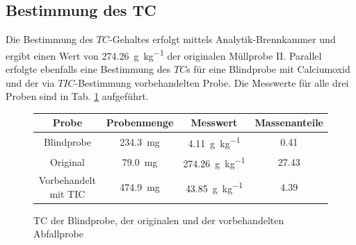 \subsection{Bestimmung des TC}
\label{sec:tc}
Die Bestimmung des $TC$-Gehaltes erfolgt mittels Analytik-Brennkammer und ergibt einen Wert von \SI{274,26}{\gram \per \kg} der originalen Müllprobe II. Parallel erfolgte ebenfalls eine Bestimmung des $TC$s für eine Blindprobe mit Calciumoxid und der via $TIC$-Bestimmung vorbehandelten Probe. Die Messwerte für alle drei Proben sind in Tab. \ref{tab:tc_messung} aufgeführt. 
\vspace*{-2.5mm}
\begin{figure}[h!]
	\renewcommand{\arraystretch}{1.2}
	\centering
	\caption{TC der Blindprobe, der originalen und der vorbehandelten Abfallprobe}
	\label{tab:tc_messung}
	\begin{tabular}{c|c|cc}
		\hline
		\textbf{Probe} & \textbf{Probenmenge} & \textbf{Messwert}  & \textbf{Massenanteile}\\
		\hline
		Blindprobe				&	\SI{234,3}{\milli \gram}	&\SI{4,11}{\gram \per \kg} &\SI{0,41}{\mpercent}	\\
		Original				&	\SI{79,0}{\milli \gram}	& \SI{274,26}{\gram \per \kg} &\SI{27,43}{\mpercent}		 \\
		Vorbehandelt mit TIC	&	\SI{474,9}{\milli \gram}	& \SI{43,85}{\gram \per \kg} &\SI{4,39}{\mpercent}\\
		\hline
	\end{tabular}
\end{figure}
\FloatBarrier

